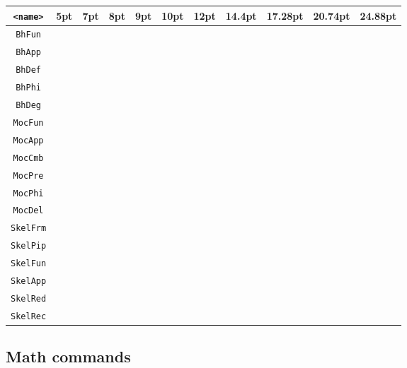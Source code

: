 \def\makesymbolrow#1{{\tiny #1} & {\scriptsize #1} & {\footnotesize #1} & {\small #1} & {\normalsize #1} & {\large #1} & {\Large #1} & {\LARGE #1} & {\huge #1} & {\Huge #1}}
\begin{longtable} { c | c c c c c c c c c c }
  \toprule
  \texttt{<name>}  & \textbf{5pt} & \textbf{7pt} & \textbf{8pt} & \textbf{9pt} & \textbf{10pt} & \textbf{12pt} & \textbf{14.4pt} & \textbf{17.28pt} & \textbf{20.74pt} & \textbf{24.88pt} \\
  \midrule
  \texttt{BhFun} & \makesymbolrow{\textBhFun} \\
  \texttt{BhApp} & \makesymbolrow{\textBhApp} \\
  \texttt{BhDef} & \makesymbolrow{\textBhDef} \\
  \texttt{BhPhi} & \makesymbolrow{\textBhPhi} \\
  \texttt{BhDeg} & \makesymbolrow{\textBhDeg} \\
  \midrule
  \texttt{MocFun} & \makesymbolrow{\textMocFun} \\
  \texttt{MocApp} & \makesymbolrow{\textMocApp} \\
  \texttt{MocCmb} & \makesymbolrow{\textMocCmb} \\
  \texttt{MocPre} & \makesymbolrow{\textMocPre} \\
  \texttt{MocPhi} & \makesymbolrow{\textMocPhi} \\
  \texttt{MocDel} & \makesymbolrow{\textMocDel} \\
  \midrule
  \texttt{SkelFrm} & \makesymbolrow{\textSkelFrm} \\
  \texttt{SkelPip} & \makesymbolrow{\textSkelPip} \\
  \texttt{SkelFun} & \makesymbolrow{\textSkelFun} \\
  \texttt{SkelApp} & \makesymbolrow{\textSkelApp} \\
  \texttt{SkelRed} & \makesymbolrow{\textSkelRed} \\
  \texttt{SkelRec} & \makesymbolrow{\textSkelRec} \\
  \bottomrule
\end{longtable}

\subsection{Math commands}
\label{sec:miscellaneous}

